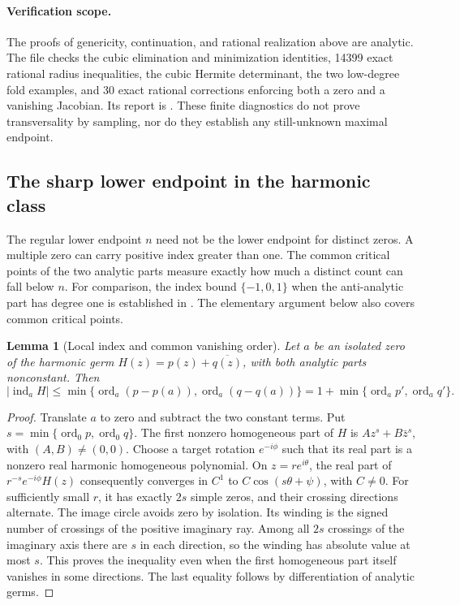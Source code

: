 \documentclass[UTF8,11pt]{ctexart}
\newtheorem{lem}[thm]{Lemma}
\theoremstyle{definition}
\numberwithin{equation}{section}
\DeclareMathOperator{\ord}{ord}\DeclareMathOperator{\Fix}{Fix}
\begin{document}
\paragraph{Verification scope.}
The proofs of genericity, continuation, and rational realization above
are analytic. The file 
checks the cubic elimination and minimization identities, 14399 exact
rational radius inequalities, the cubic Hermite determinant, the two
low-degree fold examples, and 30 exact rational corrections enforcing
both a zero and a vanishing Jacobian. Its report is
. These finite
diagnostics do not prove transversality by sampling, nor do they
establish any still-unknown maximal endpoint.


\subsection{The sharp lower endpoint in the harmonic class}
\label{v7:sec:minimum}

The regular lower endpoint $n$ need not be the lower endpoint for
distinct zeros. A multiple zero can carry positive index greater than
one. The common critical points of the two analytic parts measure
exactly how much a distinct count can fall below $n$.
For comparison, the index bound $\{-1,0,1\}$ when the anti-analytic
part has degree one is established in
\cite[Theorem~3.1, author version v2, pp.~6--7]{LuSe21}.
The elementary argument below also covers common critical points.

\begin{lem}[Local index and common vanishing order]\label{v7:lem:index}
Let $a$ be an isolated zero of the harmonic germ
$H(z)=p(z)+\overline{q(z)}$, with both analytic parts nonconstant.
Then
\begin{equation}\label{v7:eq:index}
 |\operatorname{ind}_a H|
 \le \min\{\ord_a(p-p(a)),\ord_a(q-q(a))\}
 =1+\min\{\ord_a p',\ord_a q'\}.
\end{equation}
\end{lem}
\begin{proof}
Translate $a$ to zero and subtract the two constant terms. Put
$s=\min\{\ord_0p,\ord_0q\}$. The first nonzero homogeneous part
of $H$ is $Az^s+B\bar z^s$, with $(A,B)\ne(0,0)$.
Choose a target rotation $e^{-i\phi}$ such that its real part
is a nonzero real harmonic homogeneous polynomial. On $z=re^{i\theta}$,
the real part of $r^{-s}e^{-i\phi}H(z)$ consequently converges in
$C^1$ to $C\cos(s\theta+\psi)$, with $C\ne0$.
For sufficiently small $r$, it has exactly $2s$ simple zeros,
and their crossing directions alternate. The image circle avoids
zero by isolation. Its winding is the signed number of crossings
of the positive imaginary ray. Among all $2s$ crossings of the
imaginary axis there are $s$ in each direction, so the winding
has absolute value at most $s$. This proves the inequality even
when the first homogeneous part itself vanishes in some directions.
The last equality follows by differentiation of analytic germs.
\end{proof}
\end{document}
